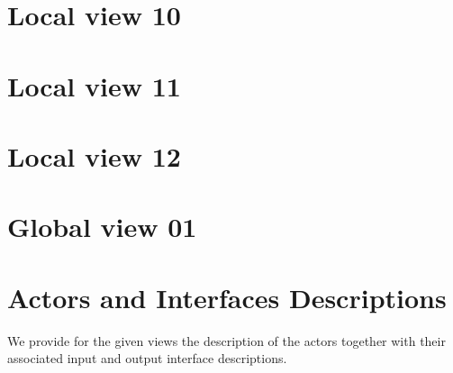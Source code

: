 \section{Local view 10}
\label{sec:lu.uni.lassy.excalibur.examples.icrash-EM-view-10-local}

\section{Local view 11}
\label{sec:lu.uni.lassy.excalibur.examples.icrash-EM-view-11-local}

\section{Local view 12}
\label{sec:lu.uni.lassy.excalibur.examples.icrash-EM-view-12-local}



\section{Global view 01}
\label{sec:lu.uni.lassy.excalibur.examples.icrash-EM-view-01-global}




\section{Actors and Interfaces Descriptions}
\label{sec:lu.uni.lassy.excalibur.examples.icrash-EM-Actors-Descriptions}


		
We provide for the given views the description of the actors together with their associated input and output interface descriptions.











